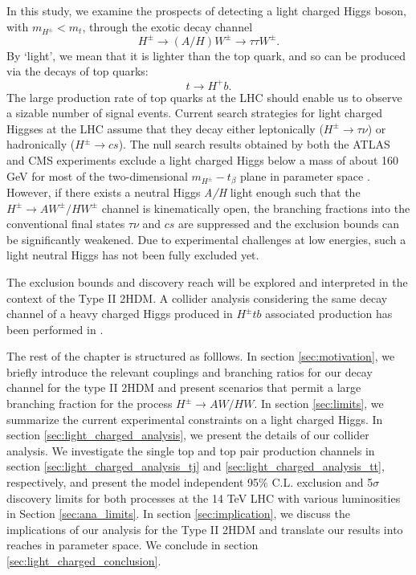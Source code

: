 In this study, we examine the prospects of detecting a light charged Higgs boson, with $m_{H^\pm}<m_t$, through the exotic decay channel
\[H^\pm\rightarrow (A/H)W^\pm\rightarrow \tau\tau W^\pm.\]
By `light', we mean that it is lighter than the top quark, and so can be produced via the decays of top quarks:
\[t\rightarrow H^+b.\]
The large production rate of top quarks at the LHC should enable us to observe a sizable number of signal events. Current search strategies for light charged Higgses at the LHC assume that they decay either leptonically ($H^{\pm} \rightarrow \tau\nu$) or hadronically ($H^{\pm} \rightarrow cs$). The null search results obtained by both the ATLAS and CMS experiments exclude a light charged Higgs below a mass of about 160 GeV for most of the two-dimensional $m_{H^\pm}-t_{\beta}$ plane in parameter space \cite{TheATLAScollaboration:2013wia,CMS:2014cdp}. However, if there exists a neutral Higgs \emph{A/H} light enough such that the $H^{\pm} \rightarrow AW^{\pm}/HW^{\pm}$ channel is kinematically open, the branching fractions into the conventional final states $\tau\nu$ and $cs$ are suppressed and the exclusion bounds can be significantly weakened. Due to experimental challenges at low energies, such a light neutral Higgs has not been fully excluded yet.

The exclusion bounds and discovery reach will be explored and interpreted in the context of the Type II 2HDM. A collider analysis considering the same decay channel of a heavy charged Higgs produced in $H^{\pm} tb$ associated production has been performed in \cite{Coleppa:2014cca}. 

The rest of the chapter is structured as folllows. In section \ref{sec:motivation}, we briefly introduce the relevant couplings and branching ratios for our decay channel for the type II 2HDM and present scenarios that permit a large branching fraction for the process $H^{\pm} \rightarrow AW/HW$. In section \ref{sec:limits}, we summarize the current experimental constraints on a light charged Higgs. In section \ref{sec:light_charged_analysis}, we present the details of our collider analysis. We investigate the single top and top pair production channels in section \ref{sec:light_charged_analysis_tj} and \ref{sec:light_charged_analysis_tt}, respectively, and present the model independent 95\% C.L. exclusion and 5$\sigma$ discovery limits for both processes at the 14 TeV LHC with various luminosities in Section \ref{sec:ana_limits}. In section \ref{sec:implication}, we discuss the implications of our analysis for the Type II 2HDM and translate our results into reaches in parameter space. We conclude in section \ref{sec:light_charged_conclusion}.
 
